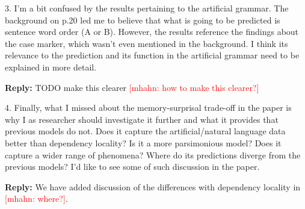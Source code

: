 \documentclass{article}[11pt,a4paper,oneside]
\newcommand\mhahn[1]{\textcolor{red}{[mhahn: #1]}}
\newenvironment{reply}
  {\par\medskip
   \color{blue}%
   \begin{framed}
   \textbf{Reply: }\ignorespaces}
 {\end{framed}
  \medskip}
\begin{document}
3. I'm a bit confused by the results pertaining to the artificial grammar. The background on p.20 led me to believe that what is going to be predicted is sentence word order (A or B). However, the results reference the findings about the case marker, which wasn't even mentioned in the background. I think its relevance to the prediction and its function in the artificial grammar need to be explained in more detail.

\begin{reply}
	TODO make this clearer \mhahn{how to make this clearer?}
\end{reply}

4. Finally, what I missed about the memory-surprisal trade-off in the paper is why I as researcher should investigate it further and what it provides that previous models do not. Does it capture the artificial/natural language data better than dependency locality? Is it a more parsimonious model? Does it capture a wider range of phenomena? Where do its predictions diverge from the previous models? I'd like to see some of such discussion in the paper.

\begin{reply}
	We have added discussion of the differences with dependency locality in \mhahn{where?}.
\end{reply}
\end{document}
